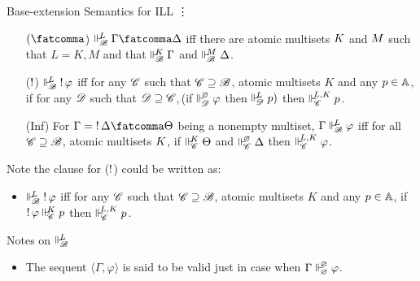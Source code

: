 \documentclass{beamer}
\begin{document}
\begin{frame}{Base-extension Semantics for ILL}
	\hspace{0.5\textwidth}\vdots
	\begin{center}
	\begin{itemize}
        \item[$(\fatcomma$)] $\suppM{\baseB}{\at{L}}\Gamma\fatcomma\Delta$ iff there are atomic multisets ${K}$ and ${M}$ such that $L=K,M$ and that $\Vdash_{ \!\!\mathscr{B} }^{ \!\!{K} }\Gamma$ and $\Vdash_{ \!\!\mathscr{B} }^{ \!\!{M} }\Delta$.
        \item[($\mathop{!}$)] $\Vdash_{ \!\!\mathscr{B} }^{ \!\!L } \mathop{!} \varphi$ iff for any $\mathscr{C}$ such that $\mathscr{C} \supseteq \mathscr{B}$, atomic multisets $K$ and any ${p} \in \mathbb{A}$, if for any $\mathscr{D}$ such that $\mathscr{D}\supseteq\mathscr{C}$,\,(if $\Vdash_{ \!\!\mathscr{D} }^{ \!\!\varnothing }\varphi$ then $\Vdash_{ \!\!\mathscr{D} }^{ \!\!L }{p})$ then $\Vdash_{ \!\!\mathscr{C} }^{ \!\!L,K }{p}$.
        \item[(Inf)] For $\Gamma=\bang\Delta\fatcomma\Theta$ being a nonempty multiset, $\Gamma \Vdash_{ \!\!\mathscr{B} }^{ \!\!L }\varphi$ iff for all $\mathscr{C} \supseteq \mathscr{B}$, atomic multisets ${K}$, if $\Vdash_{ \!\!\mathscr{C} }^{ \!\!{K} }\Theta$ and $\Vdash_{ \!\!\mathscr{C} }^{ \!\!\varnothing }\Delta$ then $\Vdash_{ \!\!\mathscr{C} }^{ \!\!L,K }\varphi$.
	\end{itemize}
	\end{center}
	\pause
	Note the clause for ($\mathop{!}$) could be written as:
	\begin{itemize}
		\item $\Vdash_{ \!\!\mathscr{B} }^{ \!\!L } \mathop{!} \varphi$ iff for any $\mathscr{C}$ such that $\mathscr{C} \supseteq \mathscr{B}$, atomic multisets $K$ and any ${p} \in \mathbb{A}$, if $\mathop{!}\varphi\Vdash_{ \!\!\mathscr{C} }^{ \!\!K }{p}$ then $\Vdash_{ \!\!\mathscr{C} }^{ \!\!L,K }{p}$.
	\end{itemize}
	\end{frame}
\begin{frame}{Notes on $\Vdash_{ \!\!\mathscr{B} }^{ \!\!{L} }$}
	\begin{itemize}
	\item The sequent $\langle\Gamma,\varphi\rangle$ is said to be valid just in case when $\Gamma\Vdash_{ \!\!\varnothing }^{ \!\!\varnothing }\varphi$.
	\end{itemize}
\end{frame}
\end{document}
